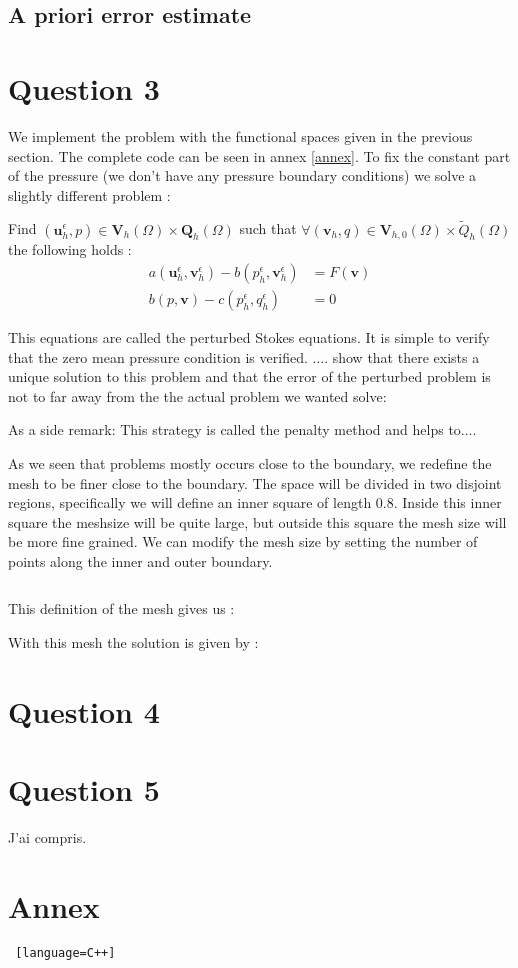 \documentclass{article}
\begin{document}
\subsection*{A priori error estimate}

\section*{Question 3}
We implement the problem with the functional spaces given in the previous
section. The complete code can be seen in annex \ref{annex}. To fix the
constant part of the pressure (we don't have any pressure boundary conditions)
we solve a slightly different problem :

Find $(\mathbf{u}^\epsilon_h,p)\in \mathbf{V}_h(\Omega) \times \mathbf{Q}_h(\Omega)$ such that
$\forall (\mathbf{v}_h,q)\in \mathbf{V}_{h,0}(\Omega) \times \tilde{Q}_h(\Omega)$ the
following holds :
\begin{align}
	\label{abstract_form_dis}
	a(\mathbf{u}^\epsilon_h,\mathbf{v}^\epsilon_h) -
	b(p^\epsilon_h,\mathbf{v}^\epsilon_h) &= F(\mathbf{v}) \\ b(p,\mathbf{v}) -
	c(p^\epsilon_h,q^\epsilon_h) &= 0 \nonumber
\end{align}

This equations are called the perturbed Stokes equations. It is simple to
verify that the zero mean pressure condition is verified. .... show that there
exists a unique solution to this problem and that the error of the perturbed
problem is not to far away from the the actual problem we wanted solve:

As a side remark: This strategy is called the penalty method and helps to.... 

As we seen that problems mostly occurs close to the boundary, we redefine the
mesh to be finer close to the boundary. The space will be divided in two
disjoint regions, specifically we will define an inner square of length 0.8.
Inside this inner square the meshsize will be quite large, but outside this
square the mesh size will be more fine grained. We can  modify the mesh size by
setting the number of points along the inner and outer boundary. 

\begin{lstlisting}[language=C++]
\end{lstlisting}


This definition of the mesh gives us :

With this mesh the solution is given by :

\section*{Question 4}

\section*{Question 5}
J'ai compris.

\section*{Annex} \label{annex}
\begin{lstlisting} [language=C++]
\end{lstlisting}
\end{document}
